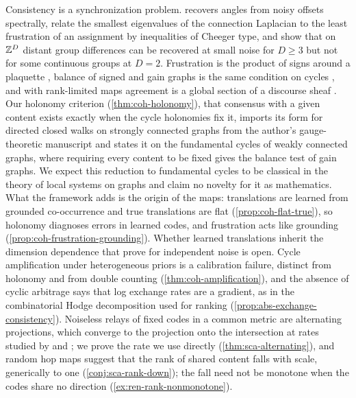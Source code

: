 Consistency is a synchronization problem. \citet{singer2011angular} recovers angles from noisy offsets spectrally, \citet{bandeira2013cheeger} relate the smallest eigenvalues of the connection Laplacian to the least frustration of an assignment by inequalities of Cheeger type, and \citet{abbe2018group} show that on $\mathbb{Z}^D$ distant group differences can be recovered at small noise for $D\ge3$ but not for some continuous groups at $D=2$. Frustration is the product of signs around a plaquette \citep{toulouse1977theory}, balance of signed and gain graphs is the same condition on cycles \citep{harary1953notion,zaslavsky1989biased}, and with rank-limited maps agreement is a global section of a discourse sheaf \citep{hansen2021opinion}. Our holonomy criterion (\cref{thm:coh-holonomy}), that consensus with a given content exists exactly when the cycle holonomies fix it, imports its form for directed closed walks on strongly connected graphs from the author's gauge-theoretic manuscript \citep{dennis2026magent} and states it on the fundamental cycles of weakly connected graphs, where requiring every content to be fixed gives the balance test of gain graphs. We expect this reduction to fundamental cycles to be classical in the theory of local systems on graphs and claim no novelty for it as mathematics. What the framework adds is the origin of the maps: translations are learned from grounded co-occurrence and true translations are flat (\cref{prop:coh-flat-true}), so holonomy diagnoses errors in learned codes, and frustration acts like grounding (\cref{prop:coh-frustration-grounding}). Whether learned translations inherit the dimension dependence that \citet{abbe2018group} prove for independent noise is open. Cycle amplification under heterogeneous priors is a calibration failure, distinct from holonomy and from double counting (\cref{thm:coh-amplification}), and the absence of cyclic arbitrage says that log exchange rates are a gradient, as in the combinatorial Hodge decomposition used for ranking \citep{jiang2011statistical} (\cref{prop:abs-exchange-consistency}). Noiseless relays of fixed codes in a common metric are alternating projections, which converge to the projection onto the intersection \citep{vonneumann1950functional,halperin1962product} at rates studied by \citet{kayalar1988error} and \citet{badea2012rate}; we prove the rate we use directly (\cref{thm:sca-alternating}), and random hop maps suggest that the rank of shared content falls with scale, generically to one (\cref{conj:sca-rank-down}); the fall need not be monotone when the codes share no direction (\cref{ex:ren-rank-nonmonotone}).

